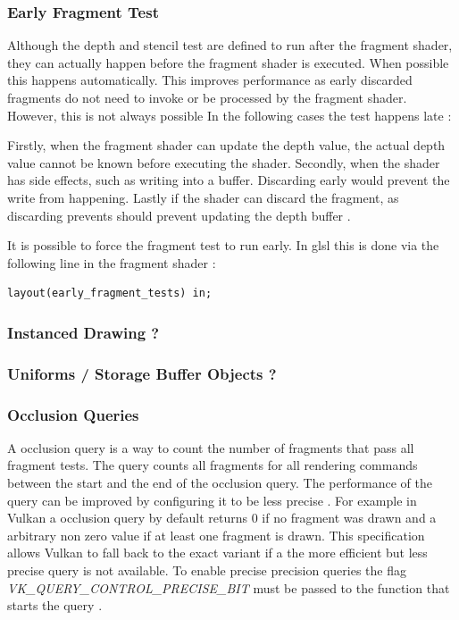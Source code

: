 \subsubsection{Early Fragment Test}
Although the depth and stencil test are defined to run after the fragment shader, they can actually happen before the fragment shader is executed. When possible this happens automatically. This improves performance as early discarded fragments do not need to invoke or be processed by the fragment shader. However, this is not always possible In the following cases the test happens late \cite{sellers:vulkanprogramming}:

Firstly, when the fragment shader can update the depth value, the actual depth value cannot be known before executing the shader. Secondly, when the shader has side effects, such as writing into a buffer. Discarding early would prevent the write from happening. Lastly if the shader can discard the fragment, as discarding prevents should prevent updating the depth buffer \cite{sellers:vulkanprogramming}.

 It is possible to force the fragment test to run early. In \gls{glsl} this is done via the following line in the fragment shader \cite{khronos:glsl4.60:spec}:
\begin{lstlisting}
layout(early_fragment_tests) in;
\end{lstlisting}


\subsubsection{Instanced Drawing ?}


\subsubsection{Uniforms / Storage Buffer Objects ?}



\subsubsection{Occlusion Queries}
A occlusion query is a way to count the number of fragments that pass all fragment tests. The query counts all fragments for all rendering commands between the start and the end of the occlusion query. The performance of the query can be improved by configuring it to be less precise \cite{akine:2018:realtime}. For example in Vulkan a occlusion query by default returns 0 if no fragment was drawn and a arbitrary non zero value if at least one fragment is drawn. This specification allows Vulkan to fall back to the exact variant if a the more efficient but less precise query is not available. To enable precise precision queries the flag \textit{VK\_QUERY\_CONTROL\_PRECISE\_BIT} must be passed to the function that starts the query \cite{khronos:vulkan:spec1.1}.

